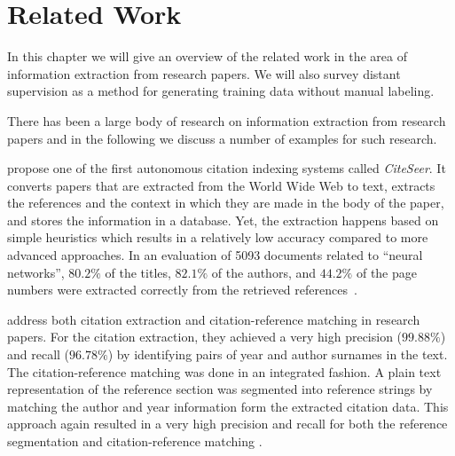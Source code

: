 \chapter{Related Work}\label{cha:related-work}
In this chapter we will give an overview of the related work in the area of information extraction from research papers.
We will also survey \gls{distant supervision} as a method for generating training data without manual labeling.

\bigskip

There has been a large body of research on information extraction from research papers and in the following we discuss a number of examples for such research.

\citet{giles1998citeseer} propose one of the first autonomous citation indexing systems called \emph{CiteSeer}.
It converts papers that are extracted from the World Wide Web to text, extracts the references and the context in which they are made in the body of the paper, and stores the information in a database.
Yet, the extraction happens based on simple heuristics which results in a relatively low accuracy compared to more advanced approaches.
In an evaluation of \num{5093} documents related to ``neural networks'', $80.2\%$ of the titles, $82.1\%$ of the authors, and $44.2\%$ of the page numbers were extracted correctly from the retrieved references~\cite{giles1998citeseer}.


\citet{powley2007evidence} address both citation extraction and citation-reference matching in research papers.
For the citation extraction, they achieved a very high precision ($99.88\%$) and recall ($96.78\%$) by identifying pairs of year and author surnames in the text.
The citation-reference matching was done in an integrated fashion.
A plain text representation of the reference section was segmented into reference strings by matching the author and year information form the extracted citation data.
This approach again resulted in a very high precision and recall for both the reference segmentation and citation-reference matching \citep{powley2007evidence}.

